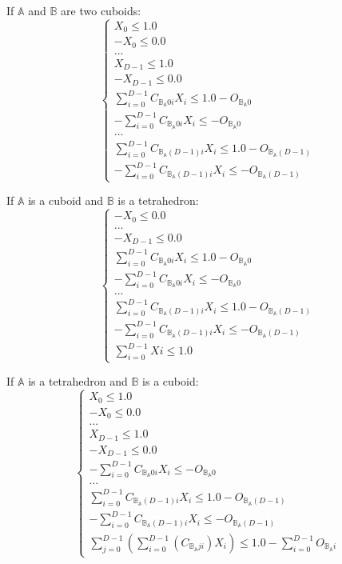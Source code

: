 \documentclass[12pt, a4paper]{article}
\begin{document}
If $\mathbb{A}$ and $\mathbb{B}$ are two cuboids:
\begin{equation}
\left\lbrace
\begin{array}{c}
X_0\le1.0\\
-X_0\le0.0\\
...\\
X_{D-1}\le1.0\\
-X_{D-1}\le0.0\\
\sum_{i=0}^{D-1}C_{\mathbb{B}_\mathbb{A}0i}X_i\le1.0-O_{\mathbb{B}_\mathbb{A}0}\\
-\sum_{i=0}^{D-1}C_{\mathbb{B}_\mathbb{A}0i}X_i\le-O_{\mathbb{B}_\mathbb{A}0}\\
...\\
\sum_{i=0}^{D-1}C_{\mathbb{B}_\mathbb{A}(D-1)i}X_i\le1.0-O_{\mathbb{B}_\mathbb{A}(D-1)}\\
-\sum_{i=0}^{D-1}C_{\mathbb{B}_\mathbb{A}(D-1)i}X_i\le-O_{\mathbb{B}_\mathbb{A}(D-1)}
\end{array}
\right.
\end{equation}

If $\mathbb{A}$ is a cuboid and $\mathbb{B}$ is a tetrahedron:
\begin{equation}
\left\lbrace
\begin{array}{c}
-X_0\le0.0\\
...\\
-X_{D-1}\le0.0\\
\sum_{i=0}^{D-1}C_{\mathbb{B}_\mathbb{A}0i}X_i\le1.0-O_{\mathbb{B}_\mathbb{A}0}\\
-\sum_{i=0}^{D-1}C_{\mathbb{B}_\mathbb{A}0i}X_i\le-O_{\mathbb{B}_\mathbb{A}0}\\
...\\
\sum_{i=0}^{D-1}C_{\mathbb{B}_\mathbb{A}(D-1)i}X_i\le1.0-O_{\mathbb{B}_\mathbb{A}(D-1)}\\
-\sum_{i=0}^{D-1}C_{\mathbb{B}_\mathbb{A}(D-1)i}X_i\le-O_{\mathbb{B}_\mathbb{A}(D-1)}\\
\sum_{i=0}^{D-1}Xi\le1.0
\end{array}
\right.
\end{equation}

If $\mathbb{A}$ is a tetrahedron and $\mathbb{B}$ is a cuboid:
\begin{equation}
\left\lbrace
\begin{array}{c}
X_0\le1.0\\
-X_0\le0.0\\
...\\
X_{D-1}\le1.0\\
-X_{D-1}\le0.0\\
-\sum_{i=0}^{D-1}C_{\mathbb{B}_\mathbb{A}0i}X_i\le-O_{\mathbb{B}_\mathbb{A}0}\\
...\\
\sum_{i=0}^{D-1}C_{\mathbb{B}_\mathbb{A}(D-1)i}X_i\le1.0-O_{\mathbb{B}_\mathbb{A}(D-1)}\\
-\sum_{i=0}^{D-1}C_{\mathbb{B}_\mathbb{A}(D-1)i}X_i\le-O_{\mathbb{B}_\mathbb{A}(D-1)}\\
\sum_{j=0}^{D-1}\left(\sum_{i=0}^{D-1}\left(C_{\mathbb{B}_\mathbb{A}ji}\right)X_i\right)\le1.0-\sum_{i=0}^{D-1}O_{\mathbb{B}_\mathbb{A}i}
\end{array}
\right.
\end{equation}
\end{document}
